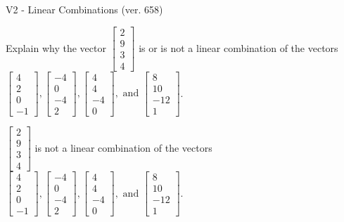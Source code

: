 \begin{exercise}
  \begin{exerciseTitle}V2 - Linear Combinations (ver. 658)\end{exerciseTitle}
  \begin{exerciseStatement}
    Explain why the vector \(\left[\begin{array}{c}
2 \\
9 \\
3 \\
4
\end{array}\right]\)  is or is not a linear 
	combination of the vectors \(\left[\begin{array}{c}
4 \\
2 \\
0 \\
-1
\end{array}\right] , \left[\begin{array}{c}
-4 \\
0 \\
-4 \\
2
\end{array}\right] , \left[\begin{array}{c}
4 \\
4 \\
-4 \\
0
\end{array}\right] , \text{ and } \left[\begin{array}{c}
8 \\
10 \\
-12 \\
1
\end{array}\right]\).
	


  \end{exerciseStatement}
  \begin{exerciseAnswer}
   \(\left[\begin{array}{c}
2 \\
9 \\
3 \\
4
\end{array}\right]\) 
  	 is not  
	a linear combination of the vectors \(\left[\begin{array}{c}
4 \\
2 \\
0 \\
-1
\end{array}\right] , \left[\begin{array}{c}
-4 \\
0 \\
-4 \\
2
\end{array}\right] , \left[\begin{array}{c}
4 \\
4 \\
-4 \\
0
\end{array}\right] , \text{ and } \left[\begin{array}{c}
8 \\
10 \\
-12 \\
1
\end{array}\right]\).


\end{exerciseAnswer}
\end{exercise}
